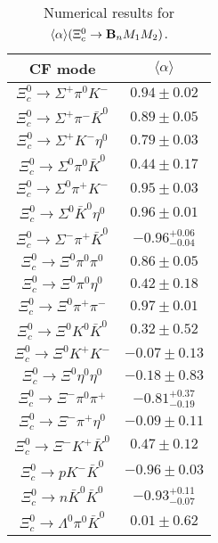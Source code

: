 \begin{table}
	\caption{Numerical results for 
		$\langle \alpha \rangle(\Xi_{c}^{0} \to {\bf B}_n M_1M_2)$.}\label{apre_Xic0}
	{\scriptsize
		\begin{tabular}{|c|c|}
			\hline
			CF mode& $\langle \alpha \rangle$\\
			\hline
			$\Xi_{c}^{0} \to  \Sigma^{+} \pi^{0} K^{-} $ & $       0.94 \pm       0.02 $ \\
			$\Xi_{c}^{0} \to  \Sigma^{+} \pi^{-} \bar{K}^{0} $ & $       0.89 \pm       0.05 $ \\
			$\Xi_{c}^{0} \to  \Sigma^{+} K^{-} \eta^{0} $ & $       0.79 \pm       0.03 $ \\
			$\Xi_{c}^{0} \to  \Sigma^{0} \pi^{0} \bar{K}^{0} $ & $       0.44 \pm       0.17 $ \\
			$\Xi_{c}^{0} \to  \Sigma^{0} \pi^{+} K^{-} $ & $       0.95 \pm       0.03 $ \\
			$\Xi_{c}^{0} \to  \Sigma^{0} \bar{K}^{0} \eta^{0} $ & $       0.96 \pm       0.01 $ \\
			$\Xi_{c}^{0} \to  \Sigma^{-} \pi^{+} \bar{K}^{0} $ & $      -0.96^{+0.06}_{-0.04} $ \\
			$\Xi_{c}^{0} \to  \Xi^{0} \pi^{0} \pi^{0} $ & $       0.86 \pm       0.05 $ \\
			$\Xi_{c}^{0} \to  \Xi^{0} \pi^{0} \eta^{0} $ & $       0.42 \pm       0.18 $ \\
			$\Xi_{c}^{0} \to  \Xi^{0} \pi^{+} \pi^{-} $ & $       0.97 \pm       0.01 $ \\
			$\Xi_{c}^{0} \to  \Xi^{0} K^{0} \bar{K}^{0} $ & $       0.32 \pm       0.52 $ \\
			$\Xi_{c}^{0} \to \Xi^{0} K^{+} K^{-} $ & $      -0.07 \pm       0.13 $ \\
			$\Xi_{c}^{0} \to  \Xi^{0} \eta^{0} \eta^{0} $ & $      -0.18 \pm       0.83 $ \\
			$\Xi_{c}^{0} \to  \Xi^{-} \pi^{0} \pi^{+} $ & $      -0.81 ^{+ 0.37}_{-0.19} $ \\
			$\Xi_{c}^{0} \to  \Xi^{-} \pi^{+} \eta^{0} $ & $      -0.09 \pm       0.11 $ \\
			$\Xi_{c}^{0} \to  \Xi^{-} K^{+} \bar{K}^{0} $ & $       0.47 \pm       0.12 $ \\
			$\Xi_{c}^{0} \to  p K^{-} \bar{K}^{0} $ & $      -0.96 \pm       0.03 $ \\
			$\Xi_{c}^{0} \to  n \bar{K}^{0} \bar{K}^{0} $ & $      -0.93^{+ 0.11}_{-0.07} $ \\
			$\Xi_{c}^{0} \to  \Lambda^{0} \pi^{0} \bar{K}^{0} $ & $       0.01 \pm       0.62 $ \\

\end{tabular}}
\end{table}
